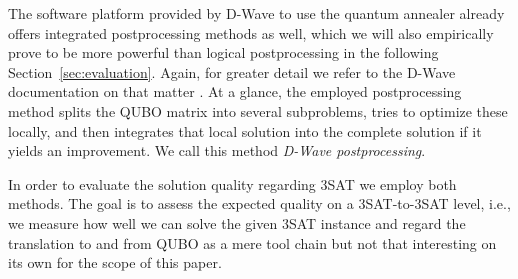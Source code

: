 The software platform provided by D-Wave to use the quantum annealer already offers integrated postprocessing methods as well, which we will also empirically prove to be more powerful than logical postprocessing in the following Section~\ref{sec:evaluation}. Again, for greater detail we refer to the D-Wave documentation on that matter \cite{dwavepostprocessing}. At a glance, the employed postprocessing method splits the QUBO matrix into several subproblems, tries to optimize these locally, and then integrates that local solution into the complete solution if it yields an improvement. We call this method \emph{D-Wave postprocessing}.

In order to evaluate the solution quality regarding 3SAT we employ both methods. The goal is to assess the expected quality on a 3SAT-to-3SAT level, i.e., we measure how well we can solve the given 3SAT instance and regard the translation to and from QUBO as a mere tool chain but not that interesting on its own for the scope of this paper.



